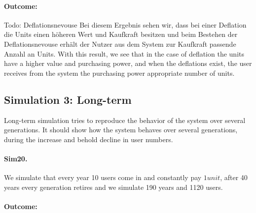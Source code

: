 \paragraph{Outcome:}

\begin{table}[hbt!]
\centering
{}
\end{table}

Todo: Deflationsnevouse
Bei diesem Ergebnis sehen wir, dass bei einer Deflation die Units einen höheren Wert und Kaufkraft besitzen und beim Bestehen der Deflationsnevouse erhält der Nutzer aus dem System zur Kaufkraft passende Anzahl an Units.
With this result, we see that in the case of deflation the units have a higher value and purchasing power, and when the deflations exist, the user receives from the system the purchasing power appropriate number of units.


\subsection{Simulation 3: Long-term}

Long-term simulation tries to reproduce the behavior of the system over several generations. It should show how the system behaves over several generations, during the increase and behold decline in user numbers.

\paragraph{Sim20.} We simulate that every year 10 users come in and constantly pay $1 unit$, after 40 years every generation retires and we simulate 190 years and 1120 users.

\paragraph{Outcome:}


